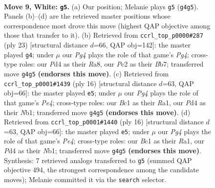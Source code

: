 \documentclass[11pt]{article}
\begin{document}
\clearpage

\begin{figure}[p]\centering
\begin{subfigure}{0.46\textwidth}\centering
\resizebox{\linewidth}{!}{%
\newchessgame
\chessboard[
  setfen={rn1qkb1r/pp3pp1/2p2n2/3p3p/3P2P1/2N2Q1P/PPP2P2/R1B1KB1R w KQkq - 0 9},
  showmover=false,
  pgfstyle=straightmove, color=movearrow, markmove={g4-g5}
]}
\caption{}
\end{subfigure}\hfill
\begin{subfigure}{0.46\textwidth}\centering
\resizebox{\linewidth}{!}{%
\newchessgame
\chessboard[
  setfen={r3kb1r/pb1p1p2/1pn1pq2/6pp/3P3P/2P2NB1/PP3PP1/R2QKB1R b KQkq - 0 12},
  showmover=false,
  pgfstyle=straightmove, color=movearrow, markmove={g5-g4}
]}
\caption{}
\end{subfigure}
\\[4pt]
\begin{subfigure}{0.46\textwidth}\centering
\resizebox{\linewidth}{!}{%
\newchessgame
\chessboard[
  setfen={rn1qk2r/p1p1bppp/1p3n2/3p4/3PP3/5NP1/PPQ2P1P/RNB2K1R w kq - 0 9},
  showmover=false,
  pgfstyle=straightmove, color=movearrow, markmove={e4-e5}
]}
\caption{}
\end{subfigure}\hfill
\begin{subfigure}{0.46\textwidth}\centering
\resizebox{\linewidth}{!}{%
\newchessgame
\chessboard[
  setfen={rn1qk2r/p1p1bppp/1p3n2/3p4/3PP3/5NP1/PPQ2P1P/RNB2K1R w kq - 0 9},
  showmover=false,
  pgfstyle=straightmove, color=movearrow, markmove={e4-e5}
]}
\caption{}
\end{subfigure}
\caption{\textbf{Move 9, White: \texttt{g5}.} (a) Our position; Melanie plays \texttt{g5} (\texttt{g4g5}). Panels (b)--(d) are the retrieved master positions whose correspondence most drove this move (highest QAP objective among those that transfer to it). (b) Retrieved from \texttt{ccrl\_top\_p0000\#287} (ply 23) [structural distance $d$=66, QAP obj=142]: the master played \texttt{g4}; under $\mu$ our \emph{Pg4} plays the role of that game's \emph{Pg4}; cross-type roles: our \emph{P}d4 as their \emph{R}a8, our \emph{P}c2 as their \emph{B}b7; transferred move \texttt{g4g5} \textbf{(endorses this move)}. (c) Retrieved from \texttt{ccrl\_top\_p0001\#1439} (ply 16) [structural distance $d$=63, QAP obj=66]: the master played \texttt{e5}; under $\mu$ our \emph{Pg4} plays the role of that game's \emph{Pe4}; cross-type roles: our \emph{B}c1 as their \emph{R}a1, our \emph{P}d4 as their \emph{N}b1; transferred move \texttt{g4g5} \textbf{(endorses this move)}. (d) Retrieved from \texttt{ccrl\_top\_p0001\#1440} (ply 16) [structural distance $d$=63, QAP obj=66]: the master played \texttt{e5}; under $\mu$ our \emph{Pg4} plays the role of that game's \emph{Pe4}; cross-type roles: our \emph{B}c1 as their \emph{R}a1, our \emph{P}d4 as their \emph{N}b1; transferred move \texttt{g4g5} \textbf{(endorses this move)}. Synthesis: 7 retrieved analogs transferred to \texttt{g5} (summed QAP objective 494, the strongest correspondence among the candidate moves); Melanie committed it via the \texttt{search} selector.}
\label{fig:thought-m16}
\end{figure}
\end{document}
